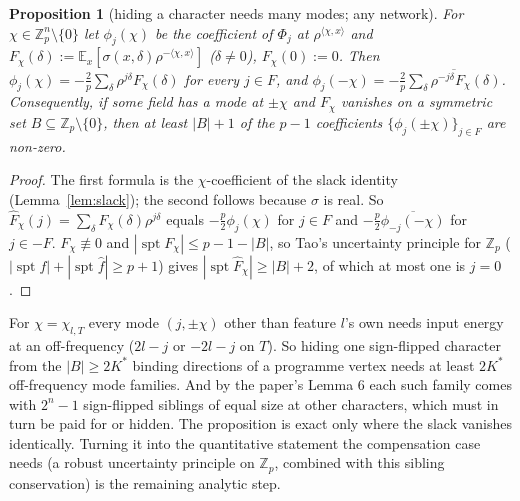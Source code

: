 \documentclass[11pt]{article}
\newtheorem{proposition}[theorem]{Proposition}
\theoremstyle{definition}
\begin{document}
\begin{proposition}[hiding a character needs many modes; any network]\label{prop:hide}
For $\chi\in\mathbb Z_p^n\setminus\{0\}$ let $\phi_j(\chi)$ be the coefficient of $\Phi_j$ at $\rho^{\langle\chi,x\rangle}$ and
$F_\chi(\delta):=\mathbb E_x[\sigma(x,\delta)\rho^{-\langle\chi,x\rangle}]$ ($\delta\ne0$), $F_\chi(0):=0$.  Then
$\phi_j(\chi)=-\frac2p\sum_\delta\rho^{j\delta}F_\chi(\delta)$ for every $j\in F$, and $\phi_j(-\chi)=-\frac2p\overline{\sum_\delta\rho^{-j\delta}F_\chi(\delta)}$.
Consequently, if some field has a mode at $\pm\chi$ and $F_\chi$ vanishes on a symmetric set $B\subseteq\mathbb Z_p\setminus\{0\}$, then at least
$|B|+1$ of the $p-1$ coefficients $\{\phi_j(\pm\chi)\}_{j\in F}$ are non-zero.
\end{proposition}
\begin{proof}
The first formula is the $\chi$-coefficient of the slack identity (Lemma~\ref{lem:slack}); the second follows because $\sigma$
is real.  So $\hat F_\chi(j)=\sum_\delta F_\chi(\delta)\rho^{j\delta}$ equals $-\frac p2\phi_j(\chi)$ for $j\in F$ and $-\frac p2\overline{\phi_{-j}(-\chi)}$
for $j\in-F$.  $F_\chi\not\equiv0$ and $|\operatorname{spt}F_\chi|\le p-1-|B|$, so Tao's uncertainty principle for $\mathbb Z_p$
($|\operatorname{spt}f|+|\operatorname{spt}\hat f|\ge p+1$) gives $|\operatorname{spt}\hat F_\chi|\ge|B|+2$, of which at most one is $j=0$.
\end{proof}
For $\chi=\chi_{l,T}$ every mode $(j,\pm\chi)$ other than feature $l$'s own needs input energy at an off-frequency ($2l-j$ or
$-2l-j$ on $T$).  So hiding one sign-flipped character from the $|B|\ge2K^*$ binding directions of a programme vertex needs at
least $2K^*$ off-frequency mode families.  And by the paper's Lemma 6 each such family comes with $2^n-1$ sign-flipped
siblings of equal size at other characters, which must in turn be paid for or hidden.  The proposition is exact only
where the slack vanishes identically.  Turning it into the quantitative statement the compensation case needs (a
robust uncertainty principle on $\mathbb Z_p$, combined with this sibling conservation) is the remaining analytic step.
\end{document}
